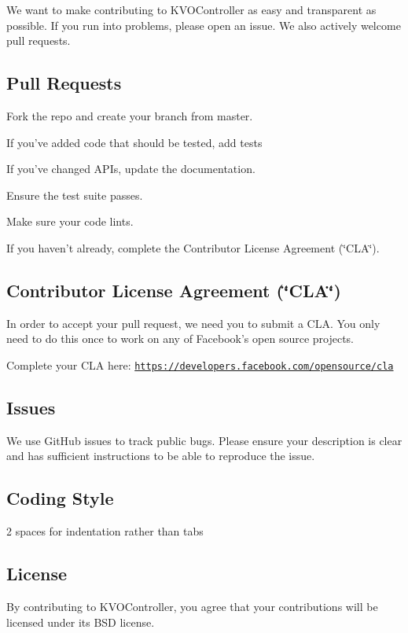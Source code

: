 We want to make contributing to K\+V\+O\+Controller as easy and transparent as possible. If you run into problems, please open an issue. We also actively welcome pull requests.

\subsection*{Pull Requests}


\begin{DoxyEnumerate}
\item Fork the repo and create your branch from {\ttfamily master}.
\item If you've added code that should be tested, add tests
\item If you've changed A\+P\+Is, update the documentation.
\item Ensure the test suite passes.
\item Make sure your code lints.
\item If you haven't already, complete the Contributor License Agreement (\char`\"{}\+C\+L\+A\char`\"{}).
\end{DoxyEnumerate}

\subsection*{Contributor License Agreement (\char`\"{}\+C\+L\+A\char`\"{})}

In order to accept your pull request, we need you to submit a C\+L\+A. You only need to do this once to work on any of Facebook's open source projects.

Complete your C\+L\+A here\+: \href{https://developers.facebook.com/opensource/cla}{\tt https\+://developers.\+facebook.\+com/opensource/cla}

\subsection*{Issues}

We use Git\+Hub issues to track public bugs. Please ensure your description is clear and has sufficient instructions to be able to reproduce the issue.

\subsection*{Coding Style}


\begin{DoxyItemize}
\item 2 spaces for indentation rather than tabs
\end{DoxyItemize}

\subsection*{License}

By contributing to K\+V\+O\+Controller, you agree that your contributions will be licensed under its B\+S\+D license. 
